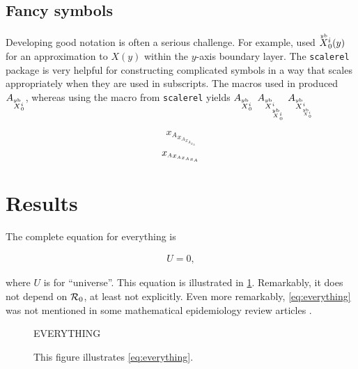 \documentclass[9pt,twocolumn,twoside]{pnas/pnas_research_article/pnas-new}
\begin{document}
\subsection{Fancy symbols}


Developing good notation is often a serious challenge.
For example, \cite{ParsEarn24} used $\overset{\textrm{\tiny\upshape $y$b}}X{}_{0}^{i}(y)$ for
an approximation to $X(y)$ within the $y$-axis
boundary layer.  The \texttt{scalerel} package is very helpful
for constructing complicated symbols in a way that scales
appropriately
when they are used in subscripts.   The macros used
in \cite{ParsEarn24} produced $A_{\overset{\textrm{\tiny\upshape $y$b}}X{}_{0}^{i}}$, whereas
using the  macro from \texttt{scalerel} yields
$A_{\overset{\textrm{\tiny\upshape $y$b}}X{}_{0}^{i}}$ $A_{\overset{\textrm{\tiny\upshape $y$b}}X{}_{\overset{\textrm{\tiny\upshape $y$b}}X{}_{0}^{i}}^{i}}$
$A_{\Xybfancy{\scaleobj{0.8}{\Xybfancy{0}{i}}}{i}}$

\newcommand{\tmpout}{{x_{A}}}
\begin{equation}
\tmpout_{\tmpout_{\tmpout_{\tmpout}}}
\end{equation}
\renewcommand{\tmpout}{{x_{\scaleobj{0.8}{A}}}}
\begin{equation}
\tmpout_{\tmpout_{\tmpout_{\tmpout}}}
\end{equation}

\section{Results}\label{sec:results}

The complete equation for everything is
\begin{linenomath*}
\begin{align}\label{eq:everything}
  U = 0,
\end{align}
\end{linenomath*}
where $U$ is for ``universe''.  This equation is illustrated
in \cref{fig:everything}.  Remarkably, it does not depend on ${\mathcal R}_0$,
at least not explicitly.  Even more remarkably, \cref{eq:everything}
was not mentioned in some mathematical epidemiology review articles
\cite{Earn+02,Earn04,Earn08,Earn09}.

\begin{figure}
  \begin{center}
    \Huge EVERYTHING
  \end{center}
  \caption{This figure illustrates \cref{eq:everything}.}
  \label{fig:everything}
\end{figure}
\end{document}
